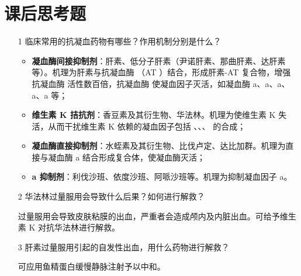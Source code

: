 \documentclass[UTF8]{ctexart}
\begin{document}
\section{课后思考题}

\begin{itemize}
    \item [1] 临床常用的抗凝血药物有哪些？作用机制分别是什么？

    \begin{itemize}
        \item \textbf{凝血酶间接抑制剂}：肝素、低分子肝素（尹诺肝素、那曲肝素、达肝素等）。机理为肝素与抗凝血酶 \uppercase\expandafter{}（AT \uppercase\expandafter{}）结合，形成肝素-AT \uppercase\expandafter{} 复合物，增强抗凝血酶 \uppercase\expandafter{} 活性数百倍，抗凝血酶 \uppercase\expandafter{} 使凝血因子灭活，如凝血酶 \uppercase\expandafter{}a、\uppercase\expandafter{}a、\uppercase\expandafter{}a、\uppercase\expandafter{}a、\uppercase\expandafter{}a 等；
        \item \textbf{维生素 K 拮抗剂}：香豆素及其衍生物、华法林。机理为使维生素 K 失活，从而干扰维生素 K 依赖的凝血因子包括 \uppercase\expandafter{}、\uppercase\expandafter{}、\uppercase\expandafter{}、\uppercase\expandafter{} 的合成；
        \item \textbf{凝血酶直接抑制剂}：水蛭素及其衍生物、比伐卢定、达比加群。机理为直接与凝血酶 \uppercase\expandafter{}a 结合形成复合体，使凝血酶灭活；
        \item \textbf{\uppercase\expandafter{}a 抑制剂}：利伐沙班、依度沙班、阿哌沙班等。机理为抑制凝血因子 \uppercase\expandafter{}a。
    \end{itemize}

    \item [2] 华法林过量服用会导致什么后果？如何进行解救？

    过量服用会导致皮肤粘膜的出血，严重者会造成颅内及内脏出血。可给予维生素 K 对抗华法林进行解救。

    \item [3] 肝素过量服用引起的自发性出血，用什么药物进行解救？

    可应用鱼精蛋白缓慢静脉注射予以中和。
\end{itemize}
\end{document}
